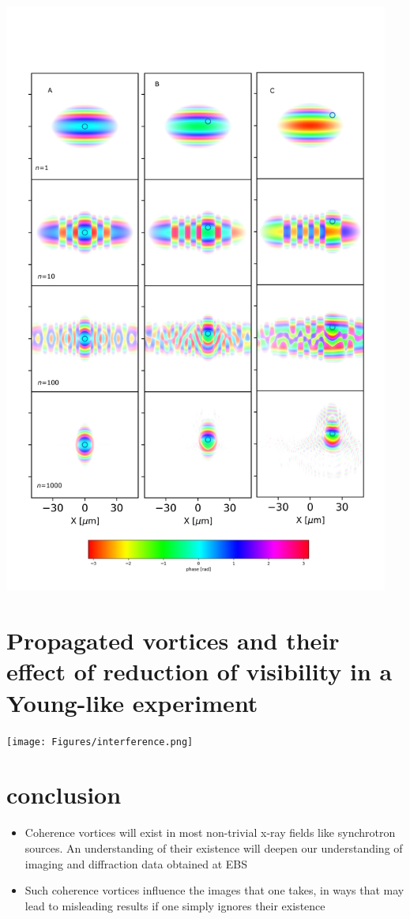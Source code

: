 \documentclass[a4paper,10pt]{article}
\begin{document}
\includegraphics[width=0.95\textwidth]{Figures/vx_id16a_ABC.png}

 
 
 \section{Propagated vortices and their effect of reduction of visibility in a Young-like experiment}

 \texttt{[image: Figures/interference.png]}
 

\section{conclusion}

\begin{itemize}
\item Coherence vortices will exist in most non-trivial x-ray fields like synchrotron sources. An understanding of their existence will deepen our understanding of imaging and diffraction data obtained at EBS
\item Such coherence vortices influence the images that one takes, in ways that may lead to misleading results if one simply ignores their existence
\end{itemize}
 
 
 
 
 
 
 
 
 


\end{document}

